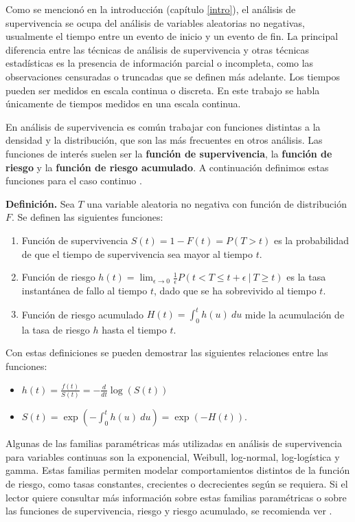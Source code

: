 \documentclass[11pt,a4paper]{article}
\begin{document}
Como se mencionó en la introducción (capítulo \ref{intro}), el análisis de supervivencia se ocupa del análisis de variables aleatorias no negativas, usualmente el tiempo entre un evento de inicio y un evento de fin.  La principal diferencia entre las técnicas de análisis de supervivencia y otras técnicas estadísticas es la presencia de información parcial o incompleta, como las observaciones censuradas o truncadas que se definen más adelante. Los tiempos pueden ser medidos en escala continua o discreta.  En este trabajo se habla únicamente de tiempos medidos en una escala continua.

En análisis de supervivencia es común trabajar con funciones distintas a la densidad y la distribución, que son las más frecuentes en otros análisis. Las funciones de interés suelen ser la \textbf{función de supervivencia}, la \textbf{función de riesgo} y la \textbf{función de riesgo acumulado}. A continuación definimos estas funciones para el caso continuo \citep{klein}.

\textbf{Definición.} Sea $T$ una variable aleatoria no negativa con función de distribución $F$. Se definen las siguientes funciones:
\begin{enumerate}
\item Función de supervivencia $S(t) = 1-F(t) = P\left( T > t \right)$ es la probabilidad de que el tiempo de supervivencia sea mayor al tiempo $t$.
\item Función de riesgo $h(t) = \lim_{\epsilon \to 0} \frac{1}{\epsilon}P\left( t<T\leq t+\epsilon \ | \ T \geq t \right)$  es la tasa instantánea de fallo al tiempo $t$, dado que se ha sobrevivido al tiempo $t$.
\item Función de riesgo acumulado $H(t) = \int_0^t h(u) \ du$ mide la acumulación de la tasa de riesgo $h$ hasta el tiempo $t$.
\end{enumerate}
Con estas definiciones se pueden demostrar las siguientes relaciones entre las funciones:
\begin{itemize}
\item $h(t) = \frac{f(t)}{S(t)} = -\frac{d}{dt}\log(S(t))$
\item $S(t) = \exp \left(-\int_0^t h(u) \ du\right) = \exp(-H(t)).$
\end{itemize}

Algunas de las familias paramétricas más utilizadas en análisis de supervivencia para variables continuas son la exponencial, Weibull, log-normal, log-logística y gamma. Estas familias permiten modelar comportamientos distintos de la función de riesgo, como tasas constantes, crecientes o decrecientes según se requiera. Si el lector quiere consultar más información sobre estas familias paramétricas o sobre las funciones de supervivencia, riesgo y riesgo acumulado, se recomienda ver \citet{klein}.
\end{document}
